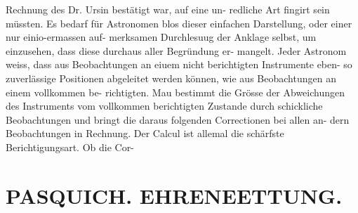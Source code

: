 \documentclass[12pt,a4paper]{article}
\begin{document}
{{{{{{{{ Rechnung  des  Dr.  Ursin  bestätigt  war,  auf  eine  un- redliche Art  fingirt  sein  müssten. Es  bedarf  für  Astronomen  blos  dieser  einfachen  Darstellung,  oder  einer  nur  einio-ermassen  auf- merksamen Durchlesuug  der  Anklage  selbst,  um  einzusehen,  dass  diese  durchaus  aller  Begründung  er- mangelt. Jeder  Astronom  weiss,  dass  aus  Beobachtungen  an  eiuem  nicht  berichtigten  Instrumente  eben- so zuverlässige  Positionen  abgeleitet  werden  können,  wie  aus  Beobachtungen  an  einem  vollkommen  be- richtigten. Mau  bestimmt  die  Grösse  der  Abweichungen  des  Instruments  vom  vollkommen  berichtigten Zustande  durch  schickliche  Beobachtungen  und  bringt  die  daraus  folgenden  Correctionen  bei  allen  an- dern Beobachtungen  in  Rechnung.    Der  Calcul  ist  allemal  die  schärfste  Berichtigungsart.     Ob  die  Cor-


\section*{PASQUICH.      EHRENEETTUNG.}

}}}}}}}}
\end{document}
